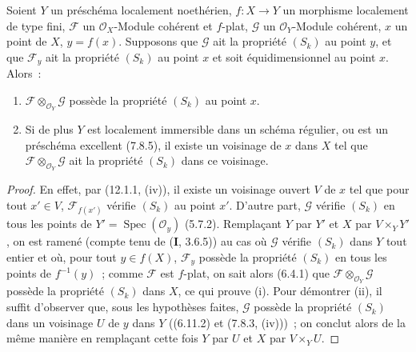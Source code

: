 \begin{corollary}[12.1.5]
\label{IV.12.1.5-fr}
Soient $Y$ un préschéma localement noethérien, $f:X\to Y$ un morphisme
localement de type fini, $\mathcal F$ un $\mathcal O_X$-Module cohérent et
$f$-plat, $\mathcal G$ un $\mathcal O_Y$-Module cohérent, $x$ un point de $X$,
$y=f(x)$. Supposons que $\mathcal G$ ait la propriété $(S_k)$ au point $y$, et
que $\mathcal F_y$ ait la propriété $(S_k)$ au point $x$ et soit
équidimensionnel au point $x$. Alors~:
\begin{enumerate}[label=(\roman*)]
  \item $\mathcal F\otimes_{\mathcal O_Y}\mathcal G$ possède la propriété
  $(S_k)$ au point $x$.
  \item Si de plus $Y$ est localement immersible dans un schéma régulier, ou
  est un préschéma excellent (7.8.5), il existe un voisinage de $x$ dans $X$
  tel que $\mathcal F\otimes_{\mathcal O_Y}\mathcal G$ ait la propriété
  $(S_k)$ dans ce voisinage.
\end{enumerate}
\end{corollary}

\begin{proof}
En effet, par (12.1.1, (iv)), il existe un voisinage ouvert $V$ de $x$ tel que
pour tout $x'\in V$, $\mathcal F_{f(x')}$ vérifie $(S_k)$ au point $x'$.
D'autre part, $\mathcal G$ vérifie $(S_k)$ en tous les points de
$Y'=\operatorname{Spec}(\mathcal O_y)$ (5.7.2). Remplaçant $Y$ par $Y'$ et $X$
par $V\times_YY'$, on est ramené (compte tenu de ($\mathbf I$, 3.6.5)) au cas
où $\mathcal G$ vérifie $(S_k)$ dans $Y$ tout entier et où, pour tout
$y\in f(X)$, $\mathcal F_y$ possède la propriété $(S_k)$ en tous les points de
$f^{-1}(y)$~; comme $\mathcal F$ est $f$-plat, on sait alors (6.4.1) que
$\mathcal F\otimes_{\mathcal O_Y}\mathcal G$ possède la propriété $(S_k)$ dans
$X$, ce qui prouve (i). Pour démontrer (ii), il suffit d'observer que, sous les
hypothèses faites, $\mathcal G$ possède la
propriété $(S_k)$ dans un voisinage $U$ de $y$ dans $Y$ ((6.11.2) et (7.8.3,
(iv)))~; on conclut alors de la même manière en remplaçant cette fois $Y$ par
$U$ et $X$ par $V\times_YU$.
\end{proof}

